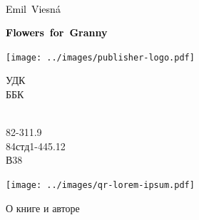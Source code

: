 \documentclass[a5paper,12pt,fleqn]{extbook}\usepackage{cooltooltips}\usepackage{polyglossia}\setdefaultlanguage[babelshorthands=true]{russian}\setotherlanguage{english}\defaultfontfeatures{Ligatures=TeX,Mapping=tex-text} \usepackage{xcolor}\definecolor{lightgray}{HTML}{bbbbbb}\color{lightgray}\newcommand{\ml}[3]{\textenglish{\textcolor{black}{#3}}}
\newcommand{\tofaauthor}{\ml{$0$}{Эмиль~Весна}{Emil~Viesn\'{a}}}
\newcommand{\tofatitle}{\ml{$0$}{ЦВЕТЫ~ДЛЯ~БАБУШКИ}{Flowers~for~Granny}}
\newcommand{\UDK}{82-311.9}
\newcommand{\BBK}{84стд1-445.12}
\newcommand{\AuthorCode}{В38}
\begin{document}
 

\newpage
\thispagestyle{plain}

\begin{titlepage}
{
\centering
{~\par}
\vspace{0.25\textheight}
{\LARGE\tofaauthor\par}
\vspace{1.3cm}
{\Huge\textbf{\tofatitle}\par}
\vfill
{\texttt{[image: ../images/publisher-logo.pdf]}\par}
}
\end{titlepage}

\newpage

\thispagestyle{plain}

\begin{minipage}[t]{2em}УДК\\ББК\\~\end{minipage}
\begin{minipage}[t]{0.8\textwidth}\UDK\\\BBK\\\AuthorCode \end{minipage}

\vfill

{\centering\texttt{[image: ../images/qr-lorem-ipsum.pdf]}\par}
\vspace{0.5em}
{\centering\small О книге и авторе\par}
\vfill
\end{document}

